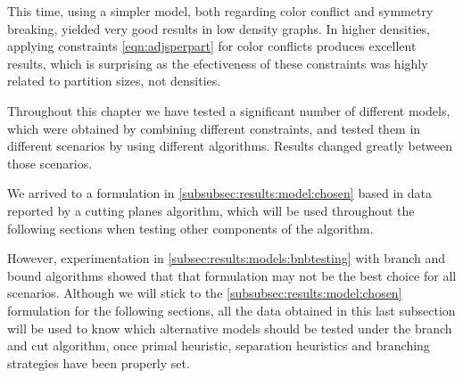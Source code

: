 This time, using a simpler model, both regarding color conflict and symmetry breaking, yielded very good results in low density graphs. In higher densities, applying constraints \ref{eqn:adjsperpart} for color conflicts produces excellent results, which is surprising as the efectiveness of these constraints was highly related to partition sizes, not densities.

\spacedhrule
Throughout this chapter we have tested a significant number of different models, which were obtained by combining different constraints, and tested them in different scenarios by using different algorithms. Results changed greatly between those scenarios.

We arrived to a formulation in \ref{subsubsec:results:model:chosen} based in data reported by a cutting planes algorithm, which will be used throughout the following sections when testing other components of the algorithm. 

However, experimentation in \ref{subsec:results:models:bnbtesting} with branch and bound algorithms showed that that formulation may not be the best choice for all scenarios. Although we will stick to the \ref{subsubsec:results:model:chosen} formulation for the following sections, all the data obtained in this last subsection will be used to know which alternative models should be tested under the branch and cut algorithm, once primal heuristic, separation heuristics and branching strategies have been properly set.

\clearpage